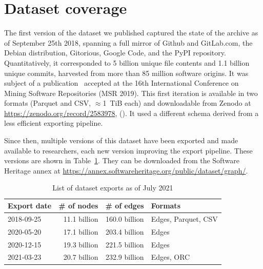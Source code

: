 \section{Dataset coverage}

The first version of the dataset we published captured the state of the \SWH{}
archive as of September 25th 2018, spanning a full mirror of Github and
GitLab.com, the Debian distribution, Gitorious, Google Code, and the PyPI
repository. Quantitatively, it corresponded to 5 billion unique file contents
and 1.1 billion unique commits, harvested from more than 85 million software
origins. It was subject of a publication~\cite{swh-msr2019-dataset} accepted at the
16th International Conference on Mining Software Repositories (MSR 2019).
This first iteration is available in two formats (Parquet and CSV,
$\approx$1~TiB each) and downloadable from Zenodo at
\url{https://zenodo.org/record/2583978}, (). It
used a different schema derived from a less efficient exporting pipeline.

Since then, multiple versions of this dataset have been exported and made
available to researchers, each new version improving the export pipeline. These
versions are shown in Table~\ref{tab:swh-dataset-exports}. They can be
downloaded from the Software Heritage annex at
\url{https://annex.softwareheritage.org/public/dataset/graph/}.

\begin{table}
  \centering
    \caption{List of dataset exports as of July 2021}%
    \label{tab:swh-dataset-exports}
    \begin{tabular}{l r r l}
        \hline\textbf{Export date} & \textbf{\# of nodes} & \textbf{\# of edges} & \textbf{Formats} \\ \hline

        2018-09-25 & 11.1 billion & 160.0 billion & Edges, Parquet, CSV \\ \hline
        2020-05-20 & 17.1 billion & 203.4 billion & Edges \\ \hline
        2020-12-15 & 19.3 billion & 221.5 billion & Edges \\ \hline
        2021-03-23 & 20.7 billion & 232.9 billion & Edges, ORC \\ \hline
    \end{tabular}
\end{table}

